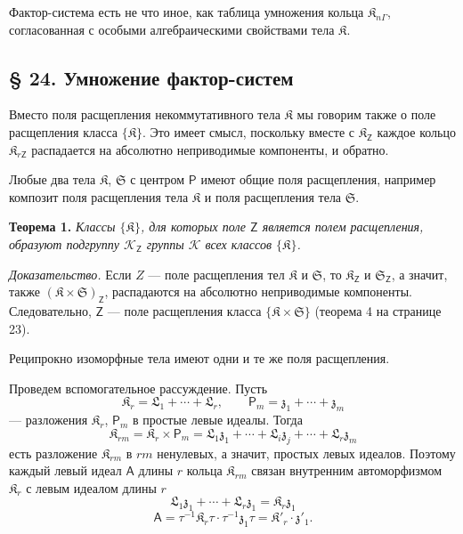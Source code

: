 \documentclass[11pt]{article}
\begin{document}
Фактор-система есть не что иное, как таблица умножения кольца \(\mathfrak K_{n\Gamma}\), согласованная с особыми алгебраическими свойствами тела \(\mathfrak K\).

\subsection*{§ 24. Умножение фактор-систем}\label{multiplikation-von-faktorensystemen}

Вместо поля расщепления некоммутативного тела \(\mathfrak K\) мы говорим также о поле расщепления класса \(\{\mathfrak K\}\). Это имеет смысл, поскольку вместе с \(\mathfrak K_{\mathsf{Z}}\) каждое кольцо \(\mathfrak K_{r\mathsf{Z}}\) распадается на абсолютно неприводимые компоненты, и обратно.

Любые два тела \(\mathfrak K\), \(\mathfrak S\) с центром \(\mathsf P\) имеют общие поля расщепления, например композит поля расщепления тела \(\mathfrak K\) и поля расщепления тела \(\mathfrak S\).

\textbf{Теорема 1.} \emph{Классы \(\{\mathfrak K\}\), для которых поле \(\mathsf{Z}\) является полем расщепления, образуют подгруппу \(\mathscr K_{\mathsf{Z}}\) группы \(\mathscr K\) всех классов \(\{\mathfrak K\}\).}

\emph{Доказательство.} Если \(Z\) --- поле расщепления тел \(\mathfrak K\) и \(\mathfrak S\), то \(\mathfrak K_{\mathsf{Z}}\) и \(\mathfrak S_{\mathsf{Z}}\), а значит, также \((\mathfrak K\times\mathfrak S)_{\mathsf{Z}}\), распадаются на абсолютно неприводимые компоненты. Следовательно, \(\mathsf{Z}\) --- поле расщепления класса \(\{\mathfrak K\times\mathfrak S\}\) (теорема 4 на странице 23).

Реципрокно изоморфные тела имеют одни и те же поля расщепления.

Проведем вспомогательное рассуждение. Пусть
\[
\mathfrak K_r=\mathfrak L_1+\cdots+\mathfrak L_r,\qquad
\mathsf P_m=\mathfrak z_1+\cdots+\mathfrak z_m
\]
--- разложения \(\mathfrak K_r\), \(\mathsf P_m\) в простые левые идеалы. Тогда
\[
\mathfrak K_{rm}=\mathfrak K_r\times\mathsf P_m
=\mathfrak L_1\mathfrak z_1+\cdots+\mathfrak L_i\mathfrak z_j+\cdots+\mathfrak L_r\mathfrak z_m
\]
есть разложение \(\mathfrak K_{rm}\) в \(rm\) ненулевых, а значит, простых левых идеалов. Поэтому каждый левый идеал \(\mathsf{A}\) длины \(r\) кольца \(\mathfrak K_{rm}\) связан внутренним автоморфизмом \(\mathfrak K_r\) с левым идеалом длины \(r\)
\[
\mathfrak L_1\mathfrak z_1+\cdots+\mathfrak L_r\mathfrak z_1=\mathfrak K_r\mathfrak z_1
\]
\[
\mathsf{A}=\tau^{-1}\mathfrak K_r\tau\cdot\tau^{-1}\mathfrak z_1\tau
=\mathfrak K'_r\cdot\mathfrak z'_1.
\]
\end{document}
